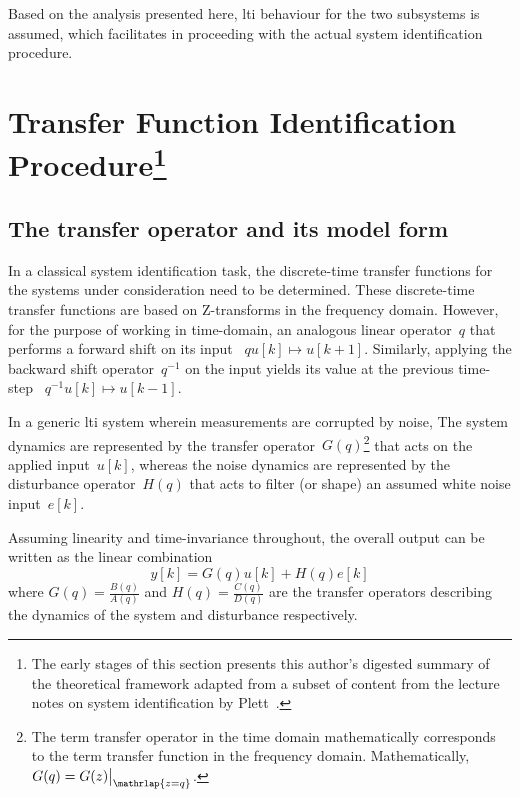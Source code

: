 Based  on  the  analysis  presented   here,  \gls{lti}  behaviour  for  the  two
subsystems is  assumed, which facilitates  in proceeding with the  actual system
identification procedure.

\section[Transfer Function Identification Procedure]{Transfer Function Identification Procedure\footnote{The early stages of this section presents this author's digested summary of the theoretical framework adapted from a subset of content from the lecture notes on system identification by Plett~\cite{PlettECE5560_02,PlettECE5560_03,PlettECE5560_04}.}}\label{sec:actualsysid}

\subsection{The transfer operator and its model form}
In a classical system identification  task, the discrete-time transfer functions
for the systems  under consideration need to be  determined. These discrete-time
transfer functions are  based on Z-transforms in the  frequency domain. However,
for the purpose of working in time-domain, an analogous linear operator~$q$ that
performs a  forward shift on  its input \ie~$  {q u[k] \longmapsto  u[k+1]} $.
Similarly, applying the  backward shift operator~$ q^{-1} $  on the input yields
its value at the previous time-step \ie~$ {q^{-1} u[k] \longmapsto u[k-1]}$.

In a generic  \gls{lti} system wherein measurements are corrupted  by noise, The
system  dynamics are  represented by  the transfer  operator~$G(q)$\footnote{The
term  transfer operator  in the  time domain  mathematically corresponds  to the
term  transfer  function  in  the  frequency  domain.  Mathematically,~${G(q)  =
G(z)\bigr\rvert_{\mathrlap{z=q}}}$.}  that  acts  on the  applied  input~$u[k]$,
whereas the  noise dynamics are  represented by the  disturbance operator~$H(q)$
that acts to filter (or shape) an assumed white noise input~$e[k]$.

Assuming linearity and time-invariance throughout, the overall output can be
written as the linear combination
\begin{equation}\label{eq:outputwithsysandnoise}
    y[k] = G(q)u[k] + H(q)e[k]
\end{equation}
where ${G(q) = \frac{B(q)}{A(q)}}$ and ${H(q) = \frac{C(q)}{D(q)}}$ are the transfer
operators describing the dynamics of the system and disturbance respectively.

